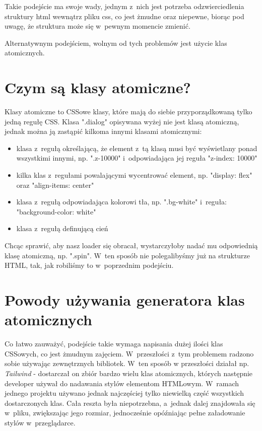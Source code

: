 \documentclass{SGGW-thesis}
\begin{document}
Takie podejście ma swoje wady, jednym z~nich jest potrzeba odzwierciedlenia struktury html wewnątrz pliku css, co jest żmudne oraz niepewne, biorąc pod uwagę, że struktura może się w~pewnym momencie zmienić.

Alternatywnym podejściem, wolnym od tych problemów jest użycie klas atomicznych\cite{css_master}.


\section{Czym są klasy atomiczne?}
Klasy atomiczne to CSSowe klasy, które mają do siebie przyporządkowaną tylko jedną regułę CSS. Klasa ".dialog" opisywana wyżej nie jest klasą atomiczną, jednak można ją zastąpić kilkoma innymi klasami atomicznymi:
\begin{itemize}
    \item klasa z~regułą określającą, że element z~tą klasą musi być wyświetlany ponad wszystkimi innymi, np. ".z-10000" i~odpowiadająca jej reguła "z-index: 10000"
    \item kilka klas z~regułami powalającymi wycentrować element, np. "display: flex" oraz "align-items: center"
    \item klasa z~regułą odpowiadająca kolorowi tła, np. ".bg-white" i~reguła: "background-color: white"
    \item klasa z~regułą definującą cień
\end{itemize}

Chcąc sprawić, aby nasz loader się obracał, wystarczyłoby nadać mu odpowiednią klasę atomiczną, np. ".spin". W~ten sposób nie polegalibyśmy już na strukturze HTML, tak, jak robiliśmy to w~poprzednim podejściu.


\section{Powody używania generatora klas atomicznych}
Co łatwo zauważyć, podejście takie wymaga napisania dużej ilości klas CSSowych, co jest żmudnym zajęciem. W~przeszłości z~tym problemem radzono sobie używając zewnętrznych bibliotek. W~ten sposób w przeszłości działał np. \emph{Tailwind} - dostarczał on zbiór bardzo wielu klas atomicznych, których następnie developer używał do nadawania stylów elementom HTMLowym. W~ramach jednego projektu używano jednak najczęściej tylko niewielką część wszystkich dostarczonych klas. Cała reszta była niepotrzebna, a~jednak dalej znajdowała się w~pliku, zwiększając jego rozmiar, jednocześnie opóźniając pełne załadowanie stylów w~przeglądarce.
\end{document}
